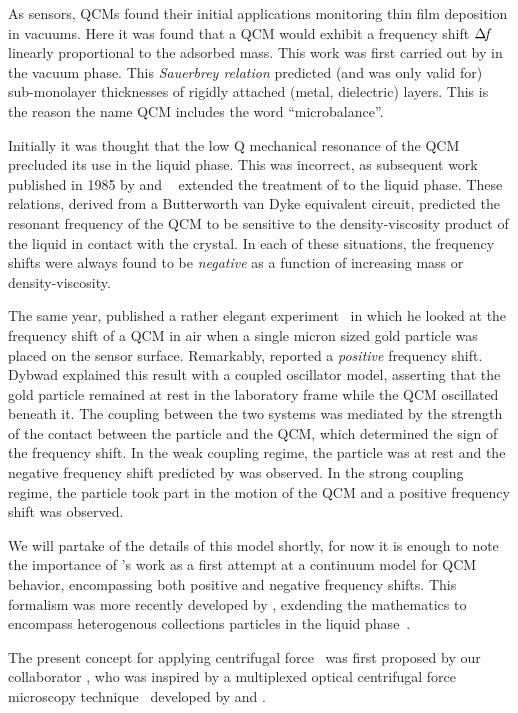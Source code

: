 As sensors, QCMs found their initial applications monitoring thin film
deposition in vacuums.  Here it was found that a QCM would exhibit a
frequency shift $\Delta\!f$ linearly proportional to the adsorbed mass.  This
work was first carried out by  in the vacuum phase.  This
\textit{Sauerbrey relation} predicted (and was only valid for) sub-monolayer
thicknesses of rigidly attached (metal, dielectric) layers.  This is the
reason the name QCM includes the word ``microbalance''.

Initially it was thought that the low Q mechanical resonance of the QCM
precluded its use in the liquid phase.  This was incorrect, as subsequent
work published in 1985 by  and
~\cite{kanazawa1985frequency} extended the treatment of
 to the liquid phase.  These relations, derived from a
Butterworth van Dyke equivalent circuit, predicted the resonant frequency
of the QCM to be sensitive to the density-viscosity product of the liquid
in contact with the crystal.  In each of these situations, the frequency
shifts were always found to be \textit{negative} as a function of
increasing mass or density-viscosity.

The same year,  published a rather elegant
experiment~\cite{dybwad1985sensitive} in which he looked at the frequency
shift of a QCM in air when a single micron sized gold particle was placed
on the sensor surface.  Remarkably,  reported a
\textit{positive} frequency shift.  Dybwad explained this result with a
coupled oscillator model, asserting that the gold particle remained at rest
in the laboratory frame while the QCM oscillated beneath it.  The coupling
between the two systems was mediated by the strength of the contact between
the particle and the QCM, which determined the sign of the frequency shift.
In the weak coupling regime, the particle was at rest and the negative
frequency shift predicted by  was observed.  In the strong
coupling regime, the particle took part in the motion of the QCM and a
positive frequency shift was observed.

We will partake of the details of this model shortly, for now it is enough
to note the importance of 's work as a first attempt at a
continuum model for QCM behavior, encompassing both positive and negative
frequency shifts.  This formalism was more recently developed by 
, exdending the mathematics to encompass heterogenous
collections particles in the liquid phase~\cite{johannsman2007contacts}.

The present concept for applying centrifugal force~\cite{webster2013qcm}
was first proposed by our collaborator , who was inspired by a
multiplexed optical centrifugal force microscopy
technique~\cite{halvorsen2010massively} developed by  and
.  
